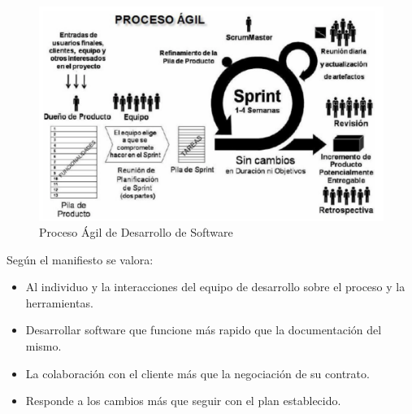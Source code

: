 \documentclass[10pt,a4paper]{article}
\begin{document}
\begin{figure}[h]
	\centering
	\includegraphics[scale=0.6]{agil.png}
	\caption{Proceso \'Agil de Desarrollo de Software}
\end{figure}

Seg\'un el manifiesto se valora:
\begin{itemize}
	\item Al individuo y la interacciones del equipo de desarrollo sobre el proceso y la herramientas.
	\item Desarrollar software que funcione m\'as rapido que la documentaci\'on del mismo.
	\item La colaboraci\'on con el cliente m\'as que la negociaci\'on de su contrato.
	\item Responde a los cambios m\'as que seguir con el plan establecido.
\end{itemize}
\end{document}
